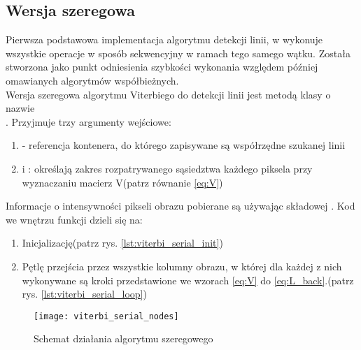 \documentclass[document.tex]{subfiles}
\begin{document}
\subsection{Wersja szeregowa}
\indent Pierwsza podstawowa implementacja algorytmu detekcji linii, w wykonuje wszystkie operacje w sposób sekwencyjny  w ramach tego samego wątku. Została stworzona jako punkt odniesienia szybkości wykonania względem później omawianych algorytmów współbieżnych.
\\
\indent Wersja szeregowa algorytmu Viterbiego do detekcji linii jest metodą klasy  o nazwie
\\ . Przyjmuje trzy argumenty wejściowe:
\begin{enumerate}
    \item {} - referencja kontenera, do którego zapisywane są współrzędne szukanej linii
    \item {} i  : określają zakres rozpatrywanego sąsiedztwa każdego piksela przy wyznaczaniu macierz V(patrz równanie \ref{eq:V})
\end{enumerate}
Informacje o intensywności pikseli obrazu pobierane są używając składowej .
\clearpage
Kod we wnętrzu funkcji dzieli się na:
\begin{enumerate}
    \item Inicjalizację(patrz rys. \ref{lst:viterbi_serial_init})
    \item Pętlę przejścia przez wszystkie kolumny obrazu, w której dla każdej z nich wykonywane są kroki przedstawione we wzorach \ref{eq:V} do \ref{eq:L_back}.(patrz rys. \ref{lst:viterbi_serial_loop})
\end{enumerate}

 

 

\begin{figure}[h]
\texttt{[image: viterbi\_serial\_nodes]}
\caption{Schemat działania algorytmu szeregowego}
\label{fig:viterbi_serial_nodes}
\end{figure}

\clearpage
\end{document}
